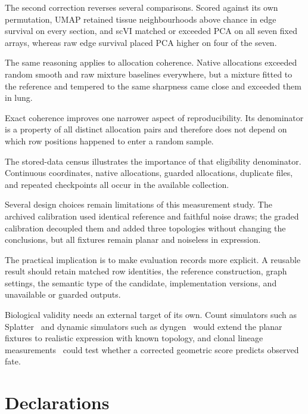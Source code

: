 \documentclass[11pt]{article}
\begin{document}
The second correction reverses several comparisons. Scored against its own permutation, UMAP retained tissue neighbourhoods above chance in edge survival on every section, and scVI matched or exceeded PCA on all seven fixed arrays, whereas raw edge survival placed PCA higher on four of the seven.

The same reasoning applies to allocation coherence. Native allocations exceeded random smooth and raw mixture baselines everywhere, but a mixture fitted to the reference and tempered to the same sharpness came close and exceeded them in lung.

Exact coherence improves one narrower aspect of reproducibility. Its denominator is a property of all distinct allocation pairs and therefore does not depend on which row positions happened to enter a random sample.

The stored-data census illustrates the importance of that eligibility denominator. Continuous coordinates, native allocations, guarded allocations, duplicate files, and repeated checkpoints all occur in the available collection.

Several design choices remain limitations of this measurement study. The archived calibration used identical reference and faithful noise draws; the graded calibration decoupled them and added three topologies without changing the conclusions, but all fixtures remain planar and noiseless in expression.

The practical implication is to make evaluation records more explicit. A reusable result should retain matched row identities, the reference construction, graph settings, the semantic type of the candidate, implementation versions, and unavailable or guarded outputs.

Biological validity needs an external target of its own. Count simulators such as Splatter~\cite{zappia2017splatter} and dynamic simulators such as dyngen~\cite{cannoodt2021dyngen} would extend the planar fixtures to realistic expression with known topology, and clonal lineage measurements~\cite{weinreb2020lineage} could test whether a corrected geometric score predicts observed fate.

\section{Declarations}
\end{document}
